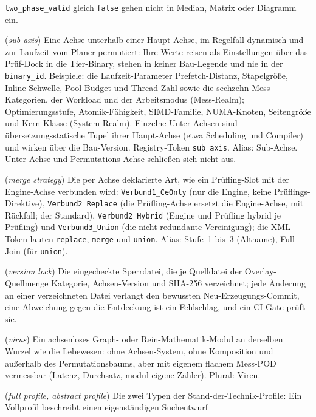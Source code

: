 \begin{description}
  \texttt{two\_phase\_valid} gleich \texttt{false} gehen nicht in Median, Matrix oder Diagramm ein.
  \item[Unter-Achse] (\emph{sub-axis}) Eine Achse unterhalb einer Haupt-Achse, im Regelfall
  dynamisch und zur Laufzeit vom Planer permutiert: Ihre Werte reisen als Einstellungen über das
  Prüf-Dock in die Tier-Binary, stehen in keiner Bau-Legende und nie in der \texttt{binary\_id}.
  Beispiele: die Laufzeit-Parameter Prefetch-Distanz, Stapelgröße, Inline-Schwelle, Pool-Budget und
  Thread-Zahl sowie die sechzehn Mess-Kategorien, der Workload und der Arbeitsmodus (Mess-Realm);
  Optimierungsstufe, Atomik-Fähigkeit, SIMD-Familie, NUMA-Knoten, Seitengröße und Kern-Klasse
  (System-Realm). Einzelne Unter-Achsen sind übersetzungsstatische Tupel ihrer Haupt-Achse (etwa
  Scheduling und Compiler) und wirken über die Bau-Version. Registry-Token \texttt{sub\_axis}.
  Alias: Sub-Achse. Unter-Achse und Permutations-Achse schließen sich nicht aus.
  \item[Verbund-Strategie] (\emph{merge strategy}) Die per Achse deklarierte Art, wie ein
  Prüfling-Slot mit der Engine-Achse verbunden wird: \texttt{Verbund1\_CeOnly} (nur die Engine,
  keine Prüflings-Direktive), \texttt{Verbund2\_Replace} (die Prüfling-Achse ersetzt die
  Engine-Achse, mit Rückfall; der Standard), \texttt{Verbund2\_Hybrid} (Engine und Prüfling hybrid
  je Prüfling) und \texttt{Verbund3\_Union} (die nicht-redundante Vereinigung); die XML-Token
  lauten \texttt{replace}, \texttt{merge} und \texttt{union}. Alias: Stufe~1 bis~3 (Altname), Full
  Join (für \texttt{union}).
  \item[Versions-Lock] (\emph{version lock}) Die eingecheckte Sperrdatei, die je Quelldatei der
  Overlay-Quellmenge Kategorie, Achsen-Version und SHA-256 verzeichnet; jede Änderung an einer
  verzeichneten Datei verlangt den bewussten Neu-Erzeugungs-Commit, eine Abweichung gegen die
  Entdeckung ist ein Fehlschlag, und ein CI-Gate prüft sie.
  \item[Virus] (\emph{virus}) Ein achsenloses Graph- oder Rein-Mathematik-Modul an derselben
  Wurzel wie die Lebewesen: ohne Achsen-System, ohne Komposition und außerhalb des
  Permutationsbaums, aber mit eigenem flachem Mess-POD vermessbar (Latenz, Durchsatz, modul-eigene
  Zähler). Plural: Viren.
  \item[Vollprofil, abstraktes Profil] (\emph{full profile, abstract profile}) Die zwei Typen der
  Stand-der-Technik-Profile: Ein Vollprofil beschreibt einen eigenständigen Suchentwurf

\end{description}
